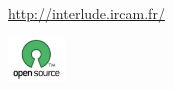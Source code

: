 \begin{frame}
	\frametitle{}	
	\begin{center}
	
	\bigskip
	{} \\
	\href{http://interlude.ircam.fr/}{http://interlude.ircam.fr/}
	
	\bigskip
	\bigskip
	\includegraphics[width=15mm]{imgs/opensource} \\
	\end{center}
	
\end{frame}





